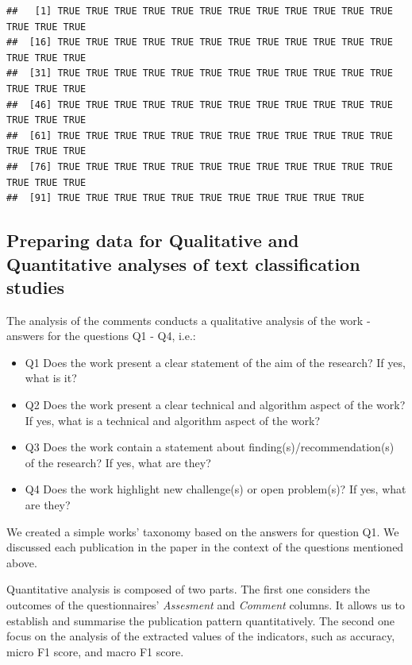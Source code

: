 \documentclass[
]{article}
\providecommand{\tightlist}{%
  \setlength{\itemsep}{0pt}\setlength{\parskip}{0pt}}
\begin{document}
\begin{verbatim}
##   [1] TRUE TRUE TRUE TRUE TRUE TRUE TRUE TRUE TRUE TRUE TRUE TRUE TRUE TRUE TRUE
##  [16] TRUE TRUE TRUE TRUE TRUE TRUE TRUE TRUE TRUE TRUE TRUE TRUE TRUE TRUE TRUE
##  [31] TRUE TRUE TRUE TRUE TRUE TRUE TRUE TRUE TRUE TRUE TRUE TRUE TRUE TRUE TRUE
##  [46] TRUE TRUE TRUE TRUE TRUE TRUE TRUE TRUE TRUE TRUE TRUE TRUE TRUE TRUE TRUE
##  [61] TRUE TRUE TRUE TRUE TRUE TRUE TRUE TRUE TRUE TRUE TRUE TRUE TRUE TRUE TRUE
##  [76] TRUE TRUE TRUE TRUE TRUE TRUE TRUE TRUE TRUE TRUE TRUE TRUE TRUE TRUE TRUE
##  [91] TRUE TRUE TRUE TRUE TRUE TRUE TRUE TRUE TRUE TRUE TRUE
\end{verbatim}

\hypertarget{preparing-data-for-qualitative-and-quantitative-analyses-of-text-classification-studies}{%
\subsection{Preparing data for Qualitative and Quantitative analyses of text classification studies}\label{preparing-data-for-qualitative-and-quantitative-analyses-of-text-classification-studies}}

The analysis of the comments conducts a qualitative analysis of the work - answers for the questions Q1 - Q4, i.e.:

\begin{itemize}
\tightlist
\item
  Q1 Does the work present a clear statement of the aim of the research? If yes, what is it?
\item
  Q2 Does the work present a clear technical and algorithm aspect of the work? If yes, what is a technical and algorithm aspect of the work?
\item
  Q3 Does the work contain a statement about finding(s)/recommendation(s) of the research? If yes, what are they?
\item
  Q4 Does the work highlight new challenge(s) or open problem(s)? If yes, what are they?
\end{itemize}

We created a simple works' taxonomy based on the answers for question Q1. We discussed each publication in the paper in the context of the questions mentioned above.

Quantitative analysis is composed of two parts. The first one considers the outcomes of the questionnaires' \emph{Assesment} and \emph{Comment} columns. It allows us to establish and summarise the publication pattern quantitatively. The second one focus on the analysis of the extracted values of the indicators, such as accuracy, micro F1 score, and macro F1 score.
\end{document}
